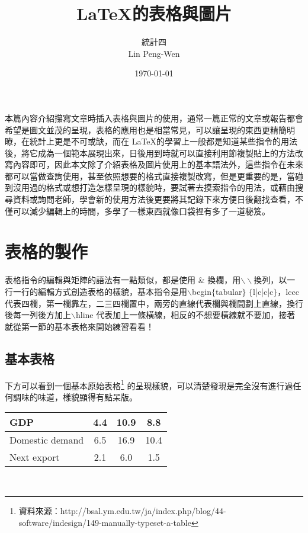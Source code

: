 
\title{ \LaTeX  {\CB 的表格與圖片}}
\author{{\CF 統計四}\\{} 	{\A Lin Peng-Wen}}
\date{{\C \today}} 	%

\maketitle
\fontsize{12}{22pt}\selectfont

本篇內容介紹攥寫文章時插入表格與圖片的使用，通常一篇正常的文章或報告都會希望是圖文並茂的呈現，表格的應用也是相當常見，可以讓呈現的東西更精簡明瞭，在統計上更是不可或缺，而在 \LaTeX 的學習上一般都是知道某些指令的用法後，將它成為一個範本展現出來，日後用到時就可以直接利用節複製貼上的方法改寫內容即可，因此本文除了介紹表格及圖片使用上的基本語法外，這些指令在未來都可以當做查詢使用，甚至依照想要的格式直接複製改寫，但是更重要的是，當碰到沒用過的格式或想打造怎樣呈現的樣貌時，要試著去摸索指令的用法，或藉由搜尋資料或詢問老師，學會新的使用方法後更要將其記錄下來方便日後翻找查看，不僅可以減少編輯上的時間，多學了一樣東西就像口袋裡有多了一道秘笈。

\section{{\CB 表格的製作}}
表格指令的編輯與矩陣的語法有一點類似，都是使用 \& 換欄，用$\backslash \backslash$換列，以一行一行的編輯方式創造表格的樣貌，基本指令是用$\backslash$begin$\lbrace$tabular$\rbrace$ $\lbrace$l|c|c|c$\rbrace$，lccc代表四欄，第一欄靠左，二三四欄置中，兩旁的直線代表欄與欄間劃上直線，換行後每一列後方加上$\backslash$hline 代表加上一條橫線，相反的不想要橫線就不要加，接著就從第一節的基本表格來開始練習看看！\\

\subsection{{\CR 基本表格}}
下方可以看到一個基本原始表格\footnote{資料來源：http://bsal.ym.edu.tw/ja/index.php/blog/44-software/indesign/149-manually-typeset-a-table} 的呈現樣貌，可以清楚發現是完全沒有進行過任何調味的味道，樣貌顯得有點呆版。\\

\begin{tabular}{|l|c|c|c|}%
\hline  %
  GDP  & 4.4  & 10.9 & 8.8		\\\hline  %
  Domestic demand     & 6.5     & 16.9 & 10.4		\\\hline
  Next export  & 2.1     & 6.0	& 1.5		\\\hline
\end{tabular}\\

